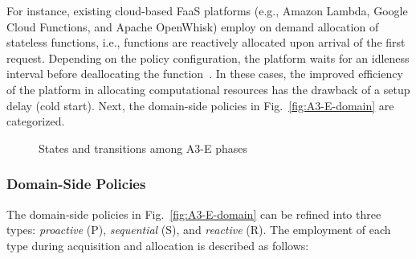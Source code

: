 For instance, existing cloud-based FaaS platforms (e.g., Amazon Lambda, Google Cloud Functions, and Apache OpenWhisk) employ on demand allocation of stateless functions, i.e., functions are reactively allocated upon arrival of the first request. Depending on the policy configuration, the platform waits for an idleness interval before deallocating the function~\cite{}. In these cases, the improved efficiency of the platform in allocating computational resources has the drawback of a setup delay (cold start). Next, the domain-side policies in Fig.~\ref{fig:A3-E-domain} are categorized.

\begin{figure}[tbp]
	\raggedright
	\hfill
	
	\hfill
	\caption{States and transitions among A3-E phases} \label{fig:A3-E-states}
\end{figure}

\subsubsection{Domain-Side Policies} The domain-side policies in Fig.~\ref{fig:A3-E-domain} can be refined into three types: \textit{proactive} (P), \textit{sequential} (S), and \textit{reactive} (R). The employment of each type during acquisition and allocation is described as follows:

